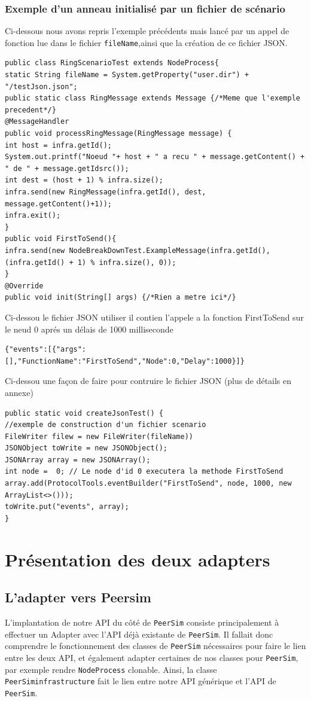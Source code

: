\documentclass{article}
\begin{document}
\subsubsection{Exemple d'un anneau initialisé par un fichier de scénario}
Ci-dessous nous avons repris l'exemple précédents mais lancé par un appel de fonction lue dans le fichier \verb|fileName|,ainsi que 
la création de ce fichier JSON.
\begin{lstlisting}
public class RingScenarioTest extends NodeProcess{
static String fileName = System.getProperty("user.dir") + "/testJson.json";
public static class RingMessage extends Message {/*Meme que l'exemple precedent*/}
@MessageHandler
public void processRingMessage(RingMessage message) {
int host = infra.getId();
System.out.printf("Noeud "+ host + " a recu " + message.getContent() + " de " + message.getIdsrc());
int dest = (host + 1) % infra.size();
infra.send(new RingMessage(infra.getId(), dest, message.getContent()+1));
infra.exit();
}
public void FirstToSend(){
infra.send(new NodeBreakDownTest.ExampleMessage(infra.getId(),(infra.getId() + 1) % infra.size(), 0));
}
@Override
public void init(String[] args) {/*Rien a metre ici*/}
\end{lstlisting}
Ci-dessou le fichier JSON utiliser il contien l'appele a la fonction FirstToSend sur le neud 0 aprés un délais de 1000 milliseconde
\begin{lstlisting}
{"events":[{"args":[],"FunctionName":"FirstToSend","Node":0,"Delay":1000}]}	
\end{lstlisting}
Ci-dessou une façon de faire pour contruire le fichier JSON (plus de détails en annexe)
\begin{lstlisting}
public static void createJsonTest() {
//exemple de construction d'un fichier scenario
FileWriter filew = new FileWriter(fileName))
JSONObject toWrite = new JSONObject();
JSONArray array = new JSONArray();
int node =  0; // Le node d'id 0 executera la methode FirstToSend
array.add(ProtocolTools.eventBuilder("FirstToSend", node, 1000, new ArrayList<>()));
toWrite.put("events", array);
}
\end{lstlisting}
						\newpage
							
		
						\section{Présentation des deux adapters}
						
						\subsection{L'adapter vers Peersim}
						L'implantation de notre API du côté de \verb|PeerSim| consiste principalement à effectuer un Adapter avec l'API déjà existante de \verb|PeerSim|. Il fallait donc comprendre le fonctionnement des classes de \verb|PeerSim| nécessaires pour faire le lien entre les deux API,  
						et également adapter certaines de nos classes pour \verb|PeerSim|, par exemple rendre \verb|NodeProcess| clonable. 
						\newline
						Ainsi, la classe \verb|PeerSiminfrastructure| fait le lien entre notre API générique et l'API de \verb|PeerSim|.
\end{document}
